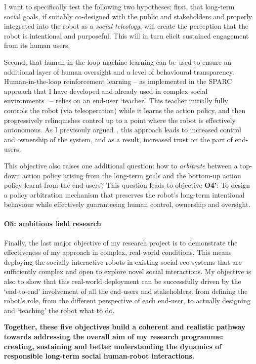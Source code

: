 I want to specifically test the following two hypotheses: first, that long-term
social goals, if suitably co-designed with the public and stakeholders and
properly integrated into the robot as a \emph{social teleology}, will create the
perception that the robot is intentional and purposeful. This will in turn
elicit sustained engagement from its human users.

Second, that human-in-the-loop machine learning can
be used to ensure an additional layer of human oversight and a level of
behavioural transparency.  Human-in-the-loop reinforcement learning -- as
implemented in the SPARC approach that I have developed and already used in
complex social
environments~\parencite{senft2017supervised,senft2019teaching,winkle2020insitu}
-- relies on an end-user `teacher'. This teacher initially fully controls the
robot (via teleoperation) while it learns the action policy, and then
progressively relinquishes control up to a point where the robot is effectively
autonomous. As I previsouly argued~\parencite{senft2019teaching}, this approach
leads to increased control and ownership of the system, and as a result,
increased trust on the part of end-users.

This objective also raises one additional question: how to \emph{arbitrate}
between a top-down action policy arising from the long-term goals and the
bottom-up action policy learnt from the end-users? This question leads to
objective {\bf O4'}: To design a policy arbitration mechanism that preserves the
robot's long-term intentional behaviour while effectively guaranteeing human
control, ownership and oversight.

\paragraph{\bf O5: ambitious field research} Finally, the last major objective
of my research project is to demonstrate the effectiveness of my approach in
complex, real-world conditions. This means deploying the socially interactive
robots in existing social eco-systems that are sufficiently complex and open to
explore novel social interactions. My objective is also to show that this
real-world deployment can be successfully driven by the `end-to-end' involvement
of all the end-users and stakeholders: from defining the robot's role, from the
different perspective of each end-user, to actually designing and `teaching' the
robot what to do.

\begin{framed}

\noindent\bf Together, these five objectives build a coherent and realistic
pathway towards addressing the overall aim of my research programme:
creating, sustaining and better understanding the dynamics of responsible
long-term social human-robot interactions.

\end{framed}



